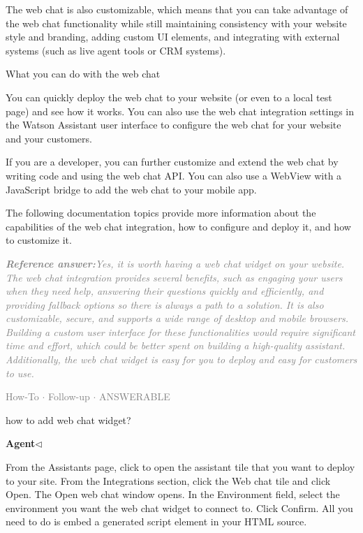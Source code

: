 \documentclass[a4paper,11pt]{article}
\begin{document}
\begin{docenv}
{The web chat is also customizable, which means that you can take advantage of the web chat functionality while still maintaining consistency with your website style and branding, adding custom UI elements, and integrating with external systems (such as live agent tools or CRM systems).





 What you can do with the web chat 

You can quickly deploy the web chat to your website (or even to a local test page) and see how it works. You can also use the web chat integration settings in the Watson Assistant user interface to configure the web chat for your website and your customers.

If you are a developer, you can further customize and extend the web chat by writing code and using the web chat API. You can also use a WebView with a JavaScript bridge to add the web chat to your mobile app.

The following documentation topics provide more information about the capabilities of the web chat integration, how to configure and deploy it, and how to customize it.}
\end{docenv}
\begin{refanswerenv}
{\footnotesize\textit{\textcolor{gray}{\textbf{Reference answer:}\enspace Yes, it is worth having a web chat widget on your website. The web chat integration provides several benefits, such as engaging your users when they need help, answering their questions quickly and efficiently, and providing fallback options so there is always a path to a solution. It is also customizable, secure, and supports a wide range of desktop and mobile browsers. Building a custom user interface for these functionalities would require significant time and effort, which could be better spent on building a high-quality assistant. Additionally, the web chat widget is easy for you to deploy and easy for customers to use.}}}
\end{refanswerenv}
\vspace{0.5em}
\hfill{\tiny\textcolor{gray}{How-To $\cdot$ Follow-up $\cdot$ ANSWERABLE}}
\begin{userbubble}
how to add web chat widget?
\end{userbubble}
\noindent\hfill{\small\textcolor{agentcolor}{\textbf{Agent\enspace$\triangleleft$}}}
\begin{agentbubble}
From the Assistants page, click to open the assistant tile that you want to deploy to your site. From the Integrations section, click the Web chat tile and click Open. The Open web chat window opens. In the Environment field, select the environment you want the web chat widget to connect to. Click Confirm. All you need to do is embed a generated script element in your HTML source.
\end{agentbubble}
\end{document}
